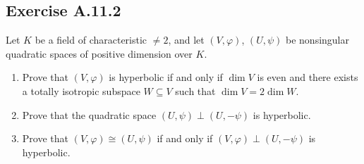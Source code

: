 \documentclass[12pt, a4paper]{article}
\begin{document}
\subsection*{Exercise A.11.2}

Let $K$ be a field of characteristic $\neq 2$, and let $(V,\varphi)$, $(U,\psi)$ be nonsingular quadratic spaces of positive dimension over $K$.

\begin{enumerate}
    \item Prove that $(V,\varphi)$ is hyperbolic if and only if $\dim V$ is even and there exists a totally isotropic subspace $W\subseteq V$ such that $\dim V=2\dim W$.

    \item Prove that the quadratic space $(U,\psi)\perp (U,-\psi)$ is hyperbolic.

    \item Prove that $(V,\varphi)\cong (U,\psi)$ if and only if $(V,\varphi)\perp (U,-\psi)$ is hyperbolic.
\end{enumerate}
\end{document}
